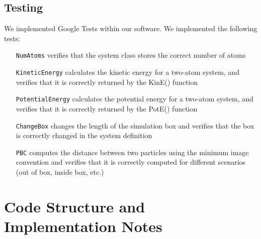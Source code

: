 \subsection{Testing}

We implemented Google Tests within our software.
%
We implemented the following tests:
	\begin{itemize}
	\item[\texttt{NumAtoms}] verifies that the system class stores the correct number of atoms
	\item[\texttt{KineticEnergy}] calculates the kinetic energy for a two-atom system, and verifies that it is correctly returned by the KinE() function
	\item[\texttt{PotentialEnergy}] calculates the potential energy for a two-atom system, and verifies that it is correctly returned by the PotE() function
	\item[\texttt{ChangeBox}] changes the length of the simulation box and verifies that the box is correctly changed in the system definition
	\item[\texttt{PBC}] computes the distance between two particles using the minimum image convention and verifies that it is correctly computed for different scenarios (out of box, inside box, etc.)
	\end{itemize}


\section{Code Structure and Implementation Notes}

